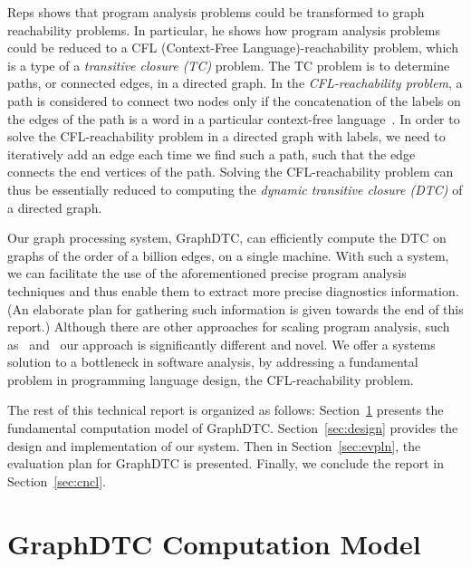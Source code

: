 \documentclass[10pt,preprint]{sigplanconf}
\begin{document}
Reps shows that program analysis problems could be transformed to graph reachability problems. In particular, he shows how program analysis problems could be reduced to a CFL (Context-Free Language)-reachability problem, which is a type of a \textit{transitive closure (TC)} problem. The TC problem is to determine paths, or connected edges, in a directed graph. In the \textit{CFL-reachability problem}, a path is considered to connect two nodes only if the concatenation of the labels on the edges of the path is a word in a particular context-free language~\cite{reps}. In order to solve the CFL-reachability problem in a directed graph with labels, we need to iteratively add an edge each time we find such a path, such that the edge connects the end vertices of the path. Solving the CFL-reachability problem can thus be essentially reduced to computing the \textit{dynamic transitive closure (DTC)} of a directed graph.  

Our graph processing system, GraphDTC, can efficiently compute the DTC on graphs of the order of a billion edges, on a single machine. With such a system, we can facilitate the use of the aforementioned precise program analysis techniques and thus enable them to extract more precise diagnostics information. (An elaborate plan for gathering such information is given towards the end of this report.) Although there are other approaches for scaling program analysis, such as~\cite{db-backed} and~\cite{hardekopf} our approach is significantly different and novel. We offer a systems solution to a bottleneck in software analysis, by addressing a fundamental problem in programming language design, the CFL-reachability problem. 

The rest of this technical report is organized as follows: Section~\ref{sec:gdtccompmod} presents the fundamental computation model of GraphDTC. Section~\ref{sec:design} provides the design and implementation of our system. Then in Section~\ref{sec:evpln}, the evaluation plan for GraphDTC is presented. Finally, we conclude the report in Section~\ref{sec:cncl}. 
 
\label{sec:prelim} 

\section{GraphDTC Computation Model}
\label{sec:gdtccompmod}
\end{document}
